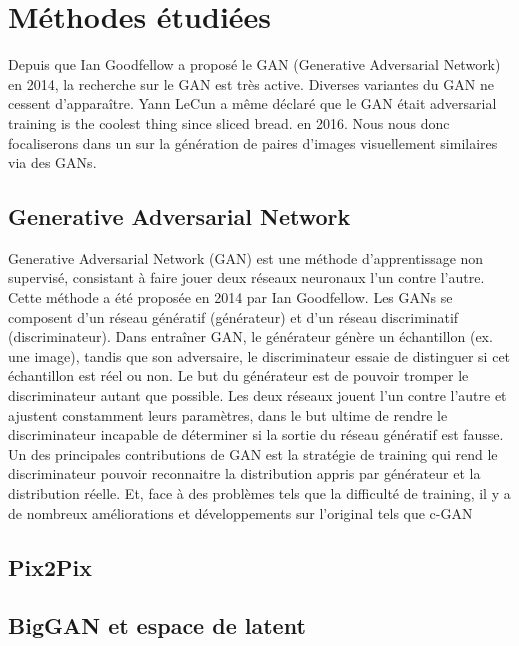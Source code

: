\chapter{Méthodes étudiées}
Depuis que Ian Goodfellow a proposé le GAN (Generative Adversarial Network) en 2014, la recherche sur le GAN est très active. Diverses variantes du GAN ne cessent d'apparaître. Yann LeCun a même déclaré que le GAN était \og{}adversarial training is the coolest thing since sliced bread.\fg{} en 2016. Nous nous donc focaliserons dans un sur la génération de paires d’images visuellement similaires via des GANs. 

\section{Generative Adversarial Network}

Generative Adversarial Network (GAN) est une méthode d'apprentissage non supervisé, consistant à faire jouer deux réseaux neuronaux l'un contre l'autre. Cette méthode a été proposée en 2014 par Ian Goodfellow\cite{goodfellow2014generative}. Les GANs se composent d'un réseau génératif (générateur) et d'un réseau discriminatif (discriminateur). Dans entraîner GAN, le générateur génère un échantillon (ex. une image), tandis que son adversaire, le discriminateur essaie de distinguer si cet échantillon est réel ou non. Le but du générateur est de pouvoir tromper le discriminateur autant que possible. Les deux réseaux jouent l'un contre l'autre et ajustent constamment leurs paramètres, dans le but ultime de rendre le discriminateur incapable de déterminer si la sortie du réseau génératif est fausse. Un des principales contributions de GAN est la stratégie de training qui rend le discriminateur pouvoir reconnaitre la distribution appris par générateur et la distribution réelle. Et, face à des problèmes tels que la difficulté de training, il y a de nombreux améliorations et développements sur l'original tels que c-GAN

\section{Pix2Pix}

\section{BigGAN et espace de latent}